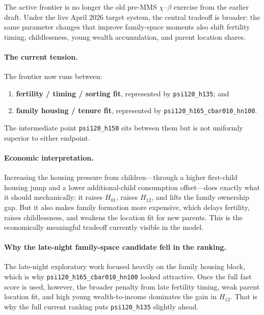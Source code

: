 \documentclass[11pt]{article}
\begin{document}
The active frontier is no longer the old pre-MMS $\chi$--$\beta$ exercise from the earlier draft. Under the live April 2026 target system, the central tradeoff is broader: the same parameter changes that improve family-space moments also shift fertility timing, childlessness, young wealth accumulation, and parent location shares.

\paragraph{The current tension.} The frontier now runs between:
\begin{enumerate}[leftmargin=*]
	\item \textbf{fertility / timing / sorting fit}, represented by \texttt{psi120\_h135}; and
	\item \textbf{family housing / tenure fit}, represented by \texttt{psi120\_h165\_cbar010\_hn100}.
\end{enumerate}
The intermediate point \texttt{psi120\_h150} sits between them but is not uniformly superior to either endpoint.

\paragraph{Economic interpretation.} Increasing the housing pressure from children---through a higher first-child housing jump and a lower additional-child consumption offset---does exactly what it should mechanically: it raises $H_{01}$, raises $H_{12}$, and lifts the family ownership gap. But it also makes family formation more expensive, which delays fertility, raises childlessness, and weakens the location fit for new parents. This is the economically meaningful tradeoff currently visible in the model.

\paragraph{Why the late-night family-space candidate fell in the ranking.} The late-night exploratory work focused heavily on the family housing block, which is why \texttt{psi120\_h165\_cbar010\_hn100} looked attractive. Once the full fast score is used, however, the broader penalty from late fertility timing, weak parent location fit, and high young wealth-to-income dominates the gain in $H_{12}$. That is why the full current ranking puts \texttt{psi120\_h135} slightly ahead.

\clearpage
\end{document}
